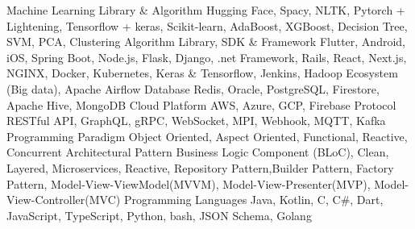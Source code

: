 
\horizontalLineRight

\skillItem
    {Machine Learning Library \& Algorithm}
    {Hugging Face, Spacy, NLTK, Pytorch + Lightening, Tensorflow + keras, Scikit-learn, AdaBoost, XGBoost, Decision Tree, SVM, PCA, Clustering Algorithm}
\skillItem
    {Library, SDK \& Framework}
    {Flutter, Android, iOS, Spring Boot, Node.js, Flask,
        Django, .net Framework, Rails,
        React, Next.js, NGINX, Docker, Kubernetes, Keras \& Tensorflow,
        Jenkins, Hadoop Ecosystem (Big data), Apache Airflow}
\skillItem
    {Database}
    {Redis, Oracle, PostgreSQL, Firestore, Apache Hive, MongoDB}
\skillItem
    {Cloud Platform}
    {AWS, Azure, GCP, Firebase}
\skillItem
    {Protocol}
    {RESTful API, GraphQL, gRPC, WebSocket, MPI, Webhook, MQTT, Kafka}
\skillItem
    {Programming Paradigm}
    {Object Oriented, Aspect Oriented, Functional, Reactive, Concurrent}
\skillItem
    {Architectural Pattern}
    {Business Logic Component (BLoC), Clean, Layered, Microservices, Reactive, Repository Pattern,Builder Pattern,
        Factory Pattern, Model-View-ViewModel(MVVM), Model-View-Presenter(MVP), Model-View-Controller(MVC)}
\skillItem
    {Programming Languages}
    {Java, Kotlin, C, C\#, Dart, JavaScript, TypeScript, Python, bash, JSON Schema, Golang}